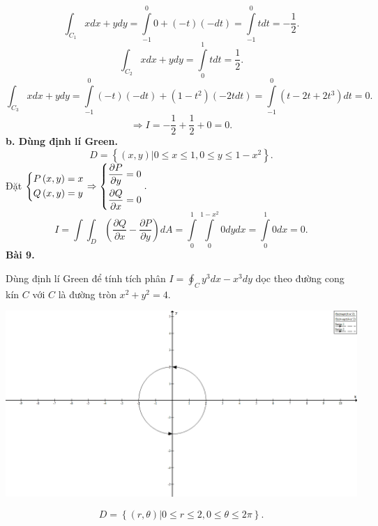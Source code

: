 \documentclass[12pt,a4paper]{article}
\begin{document}
\[\int_{{C_1}} {xdx + ydy}  = \int\limits_{ - 1}^0 {0 + \left( { - t} \right)\left( { - dt} \right)}  = \int\limits_{ - 1}^0 {tdt}  =  - \frac{1}{2}.\]
\[\int_{{C_2}} {xdx + ydy}  = \int\limits_0^1 {tdt}  = \frac{1}{2}.\]
\[\int_{{C_3}} {xdx + ydy}  = \int\limits_{ - 1}^0 {\left( { - t} \right)\left( { - dt} \right) + \left( {1 - {t^2}} \right)\left( { - 2tdt} \right)}  = \int\limits_{ - 1}^0 {\left( {t - 2t + 2{t^3}} \right)dt}  = 0.\]
\[ \Rightarrow I =  - \frac{1}{2} + \frac{1}{2} + 0 = 0.\]
\textbf{b. Dùng định lí Green.}
\[D = \left\{ {\left. {\left( {x,y} \right)} \right|0 \leqslant x \leqslant 1,0 \leqslant y \leqslant 1 - {x^2}} \right\}.\]
Đặt \(\left\{ \begin{gathered}
  P\left( {x,y} \right) = x \hfill \\
  Q\left( {x,y} \right) = y \hfill \\ 
\end{gathered}  \right. \Rightarrow \left\{ \begin{gathered}
  \frac{{\partial P}}{{\partial y}} = 0 \hfill \\
  \frac{{\partial Q}}{{\partial x}} = 0 \hfill \\ 
\end{gathered}  \right..\)
\[I = \int {\int_D {\left( {\frac{{\partial Q}}{{\partial x}} - \frac{{\partial P}}{{\partial y}}} \right)} } dA = \int\limits_0^1 {\int\limits_0^{1 - {x^2}} {0dydx}  = \int\limits_0^1 {0dx}  = 0.} \]
\textbf{Bài 9.}
\begin{mybox}
Dùng định lí Green để tính tích phân \(I = \oint_C {{y^3}dx - {x^3}dy} \) dọc theo đường cong kín \(C\) với \(C\) là đường tròn \({x^2} + {y^2} = 4.\)
\end{mybox}
\begin{center}
	\includegraphics[scale=0.3]{c4_10}
\end{center}
\[D = \left\{ {\left. {\left( {r,\theta } \right)} \right|0 \leqslant r \leqslant 2,0 \leqslant \theta  \leqslant 2\pi } \right\}.\]
\end{document}
